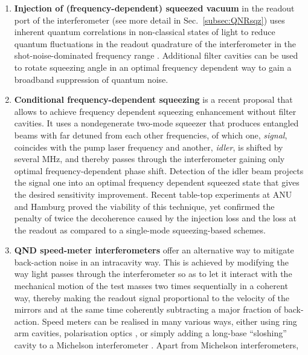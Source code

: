  \begin{enumerate}
 \item
 \textbf{Injection of (frequency-dependent) squeezed vacuum} in the readout port of the interferometer (see more detail in Sec.~\ref{subsec:QNRsqz})
uses inherent quantum correlations in non-classical states of light to reduce quantum fluctuations in the readout quadrature of the interferometer 
in the shot-noise-dominated frequency range \cite{1981_PRD.23.1693_Caves,2011_Nat.Phys.7.962_LSC,Aasi2013NatPhot,Schnabel2017}. 
Additional filter cavities can be used to rotate squeezing angle in an optimal frequency dependent way \cite{KLMTV,2013_OE.21.30114_Loss_in_FC_Isogai,Oelker2016}
to gain a broadband suppression of quantum noise. 
\item
\textbf{Conditional frequency-dependent squeezing} \cite{Ma_NPhys_13_776_2017} is a recent proposal that allows to achieve frequency dependent 
squeezing enhancement without filter cavities. It uses a nondegenerate two-mode squeezer that produces entangled beams with far detuned from 
each other frequencies, of which one, \textit{signal}, coincides with the pump laser frequency and another, \textit{idler}, is shifted by several MHz, and thereby passes through 
the interferometer gaining only optimal frequency-dependent phase shift. Detection of the idler beam projects the signal one into an optimal frequency dependent 
squeezed state that gives the desired sensitivity improvement. Recent table-top experiments at ANU \cite{2019arXivEPRsqzANU} and Hamburg \cite{2019arXivEPRsqzHamburg}
proved the viability of this technique, yet confirmed the penalty of twice the decoherence caused by the injection loss and the loss at the readout as compared to a single-mode 
squeezing-based schemes.
\item
\textbf{QND speed-meter interferometers} \cite{00a1BrGoKhTh,02a2Kh,Purdue2001,Purdue2002,Chen2003,04a1Da} offer an alternative way to mitigate back-action noise in an intracavity way.
This is achieved by modifying the way light passes through the interferometer so as to let it interact with the mechanical motion of the test masses two times sequentially in a coherent way, 
thereby making the readout signal proportional to the velocity of the mirrors and at the same time coherently subtracting a major fraction of back-action. Speed meters can be realised in many 
various ways, either using ring arm cavities\cite{Chen2003,2014_CQG.31.215009_Graef}, polarisation optics \cite{Danilishin2004,PhysRevD.87.096008,PhysRevD.86.062001,2018_PCSM_danilishin,2017_Phys.Lett.A_EPR_SM}, or simply adding a long-base ``sloshing'' cavity to a Michelson interferometer \cite{Purdue2001,Purdue2002,2019arXiv190904185F}. Apart from Michelson interferometers,

\end{enumerate}
